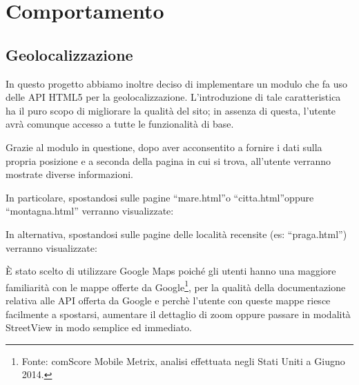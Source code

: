 \section{Comportamento}

\subsection{Geolocalizzazione}
In questo progetto abbiamo inoltre deciso di implementare un modulo che fa uso delle API HTML5 per la geolocalizzazione. L'introduzione di tale caratteristica ha il puro scopo di migliorare la qualità del sito; in assenza di questa, l'utente avrà comunque accesso a tutte le funzionalità di base.
\begin{flushleft}
Grazie al modulo in questione, dopo aver acconsentito a fornire i dati sulla propria posizione e a seconda della pagina in cui si trova, all'utente verranno mostrate diverse informazioni.
\end{flushleft}

\begin{flushleft}
In particolare, spostandosi sulle pagine “mare.html”o “citta.html”oppure “montagna.html” verranno visualizzate:
\end{flushleft}
\begin{flushleft}
In alternativa, spostandosi sulle pagine delle località recensite (es: “praga.html”) verranno visualizzate:
\end{flushleft}
È stato scelto di utilizzare Google Maps poiché gli utenti hanno una maggiore
familiarità con le mappe offerte da Google\footnote{ Fonte: comScore Mobile
Metrix, analisi effettuata negli Stati Uniti a Giugno 2014.}, per la qualità
della documentazione relativa alle API offerta da Google e perchè l'utente con
queste mappe riesce facilmente a spostarsi, aumentare il dettaglio di zoom
oppure passare in modalità StreetView in modo semplice ed immediato.


